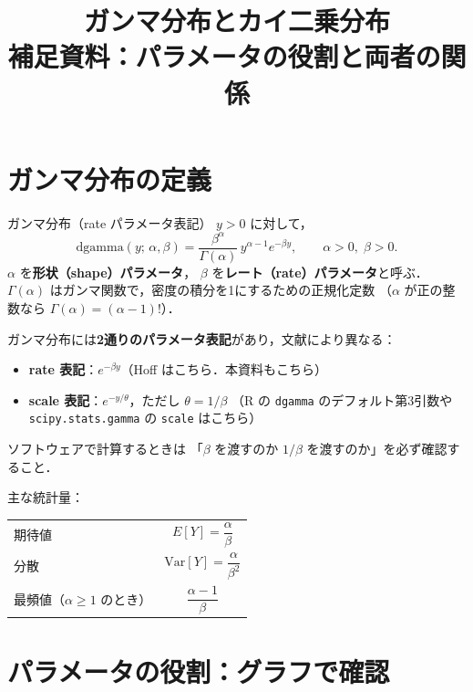 \documentclass[lualatex,ja=standard,a4paper,12pt]{bxjsarticle}
\title{\textbf{ガンマ分布とカイ二乗分布} \\[4pt]
       {\normalsize 補足資料：パラメータの役割と両者の関係}}
\author{}
\date{}
\begin{document}
\maketitle
\thispagestyle{empty}

\section{ガンマ分布の定義}

\begin{defbox}{ガンマ分布（rate パラメータ表記）}
$y > 0$ に対して，
\[
  \mathrm{dgamma}(y;\, \alpha, \beta)
  = \frac{\beta^\alpha}{\Gamma(\alpha)}\, y^{\alpha - 1} e^{-\beta y},
  \qquad \alpha > 0,\; \beta > 0.
\]
$\alpha$ を\textbf{形状（shape）パラメータ}，
$\beta$ を\textbf{レート（rate）パラメータ}と呼ぶ．
$\Gamma(\alpha)$ はガンマ関数で，密度の積分を1にするための正規化定数
（$\alpha$ が正の整数なら $\Gamma(\alpha) = (\alpha-1)!$）．
\end{defbox}

\begin{warningbox}
ガンマ分布には\textbf{2通りのパラメータ表記}があり，文献により異なる：
\begin{itemize}
  \item \textbf{rate 表記}：$e^{-\beta y}$（Hoff はこちら．本資料もこちら）
  \item \textbf{scale 表記}：$e^{-y/\theta}$，ただし $\theta = 1/\beta$
        （R の \texttt{dgamma} のデフォルト第3引数や
        \texttt{scipy.stats.gamma} の \texttt{scale} はこちら）
\end{itemize}
ソフトウェアで計算するときは
「$\beta$ を渡すのか $1/\beta$ を渡すのか」を必ず確認すること．
\end{warningbox}

\medskip
\noindent 主な統計量：
\begin{center}
\renewcommand{\arraystretch}{1.6}
\begin{tabular}{lc}
\toprule
期待値 & $E[Y] = \dfrac{\alpha}{\beta}$ \\
分散 & $\mathrm{Var}[Y] = \dfrac{\alpha}{\beta^2}$ \\
最頻値（$\alpha \geq 1$ のとき） & $\dfrac{\alpha - 1}{\beta}$ \\
\bottomrule
\end{tabular}
\end{center}

\section{パラメータの役割：グラフで確認}
\end{document}
